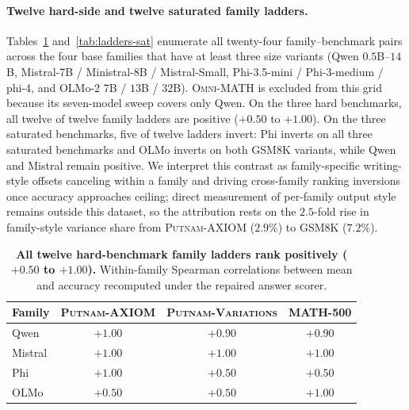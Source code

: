 \paragraph{Twelve hard-side and twelve saturated family ladders.}
Tables~\ref{tab:ladders-hard} and~\ref{tab:ladders-sat} enumerate all twenty-four family--benchmark pairs across the four base families that have at least three size variants (Qwen $0.5$B--$14$B, Mistral-7B / Ministral-8B / Mistral-Small, Phi-3.5-mini / Phi-3-medium / phi-4, and OLMo-2 $7$B / $13$B / $32$B).
\textsc{Omni-MATH} is excluded from this grid because its seven-model sweep covers only Qwen.
On the three hard benchmarks, all twelve of twelve family ladders are positive ($+0.50$ to $+1.00$).
On the three saturated benchmarks, five of twelve ladders invert: Phi inverts on all three saturated benchmarks and OLMo inverts on both \textsc{GSM8K} variants, while Qwen and Mistral remain positive.
We interpret this contrast as family-specific writing-style offsets canceling within a family and driving cross-family ranking inversions once accuracy approaches ceiling; direct measurement of per-family output style remains outside this dataset, so the attribution rests on the $2.5$-fold rise in family-style variance share from \textsc{Putnam-AXIOM} ($2.9\%$) to \textsc{GSM8K} ($7.2\%$).

\begin{table}[t]
\centering
\caption{\textbf{All twelve hard-benchmark family ladders rank positively ($+0.50$ to $+1.00$).} Within-family Spearman correlations between mean \tfa{} and accuracy recomputed under the repaired answer scorer.}
\label{tab:ladders-hard}
\scriptsize
\setlength{\tabcolsep}{3pt}
\begin{tabular}{@{}lccc@{}}
\toprule
Family & \textsc{Putnam-AXIOM} & \textsc{Putnam-Variations} & \textsc{MATH-500} \\
\midrule
Qwen & $+1.00$ & $+0.90$ & $+0.90$ \\
Mistral & $+1.00$ & $+1.00$ & $+1.00$ \\
Phi & $+1.00$ & $+0.50$ & $+0.50$ \\
OLMo & $+0.50$ & $+0.50$ & $+1.00$ \\
\bottomrule
\end{tabular}
\end{table}

